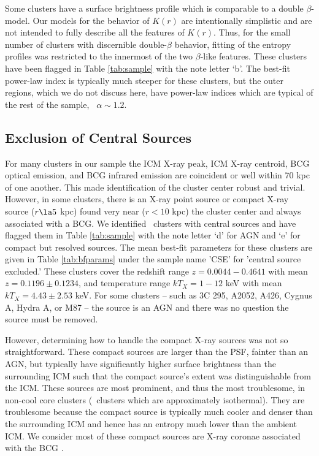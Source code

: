 \documentclass[apj]{emulateapj}
\begin{document}
Some clusters have a surface brightness profile which is comparable to
a double $\beta$-model. Our models for the behavior of $K(r)$ are
intentionally simplistic and are not intended to fully describe all
the features of $K(r)$. Thus, for the small number of clusters with
discernible double-$\beta$ behavior, fitting of the entropy profiles
was restricted to the innermost of the two $\beta$-like
features. These clusters have been flagged in Table \ref{tab:sample}
with the note letter `b'. The best-fit power-law index is typically
much steeper for these clusters, but the outer regions, which we do
not discuss here, have power-law indices which are typical of the rest
of the sample, \ie\ $\alpha \sim 1.2$.


\subsection{Exclusion of Central Sources}
\label{sec:centsrc}

For many clusters in our sample the ICM X-ray peak, ICM X-ray
centroid, BCG optical emission, and BCG infrared emission are
coincident or well within 70 kpc of one another. This made
identification of the cluster center robust and trivial. However, in
some clusters, there is an X-ray point source or compact X-ray source
($r \la 5$ kpc) found very near ($r < 10$ kpc) the cluster center and
always associated with a BCG. We identified \centsrcnum\ clusters with
central sources and have flagged them in Table \ref{tab:sample} with
the note letter `d' for AGN and `e' for compact but resolved
sources. The mean best-fit parameters for these clusters are given in
Table \ref{tab:bfparams} under the sample name 'CSE' for 'central
source excluded.' These clusters cover the redshift range $z =
0.0044-0.4641$ with mean $z = 0.1196 \pm 0.1234$, and temperature
range $kT_X = 1-12$ keV with mean $kT_X = 4.43 \pm 2.53$ keV. For some
clusters -- such as 3C 295, A2052, A426, Cygnus A, Hydra A, or M87 --
the source is an AGN and there was no question the source must be
removed.

However, determining how to handle the compact X-ray sources was not
so straightforward. These compact sources are larger than the PSF,
fainter than an AGN, but typically have significantly higher surface
brightness than the surrounding ICM such that the compact source's
extent was distinguishable from the ICM. These sources are most
prominent, and thus the most troublesome, in non-cool core clusters
(\ie\ clusters which are approximately isothermal). They are
troublesome because the compact source is typically much cooler and
denser than the surrounding ICM and hence has an entropy much lower
than the ambient ICM. We consider most of these compact sources are
X-ray coronae associated with the BCG \citep{coronae}.
\end{document}
